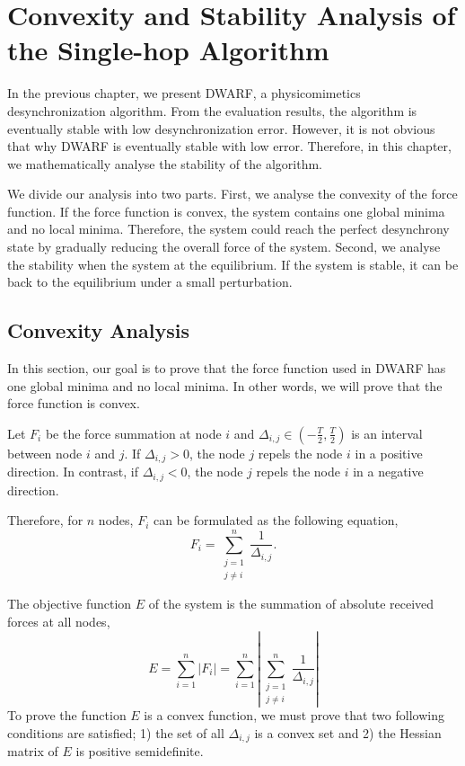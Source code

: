 \chapter{Convexity and Stability Analysis of the Single-hop Algorithm}
\label{chap:stability-singlehop}
In the previous chapter, we present DWARF, a physicomimetics desynchronization algorithm. From the evaluation results, the algorithm is eventually stable with low desynchronization error. 
However, it is not obvious that why DWARF is eventually stable with low error. 
Therefore, in this chapter, we mathematically analyse the stability of the algorithm.

We divide our analysis into two parts. First, we analyse the convexity of the force function. If the force function is convex, the system contains one global minima and no local minima. Therefore, the system could reach the perfect desynchrony state by gradually reducing the overall force of the system. Second, we analyse the stability when the system at the equilibrium. If the system is stable, it can be back to the equilibrium under a small perturbation. 

\section{Convexity Analysis}
\label{sec:convex}
In this section, our goal is to prove that the force function used in DWARF has one global minima and no local minima. In other words, we will prove that the force function is convex.

Let $F_{i}$ be the force summation at node $i$ and $\Delta_{i,j} \in (-\frac{T}{2}, \frac{T}{2})$  is an interval between node $i$ and $j$.
If $\Delta_{i,j} > 0$, the node $j$ repels the node $i$ in a positive direction.
In contrast,  if $\Delta_{i,j} < 0$, the node $j$ repels the node $i$ in a negative direction.

Therefore, for $n$ nodes, $F_{i}$ can be formulated as the following equation, 
\begin{equation}
F_{i} = \sum_{\substack{j=1\\j \neq i}}^{n} \frac{1}{\Delta_{i,j}}.
\end{equation}

The objective function $E$ of the system is the summation of absolute received forces at all nodes,
\begin{equation}
E = \sum_{i = 1}^{n}\left| F_{i} \right| = \sum_{i = 1}^{n} \left | \sum_{\substack{j=1\\j \neq i}}^{n} \frac{1}{\Delta_{i,j}} \right| 
\label{eq:energy}
\end{equation}
To prove the function $E$ is a convex function, we must prove that two following conditions are satisfied; 1) the set of all $\Delta_{i,j}$ is a convex set and 2) the Hessian matrix of $E$ is positive semidefinite. 

